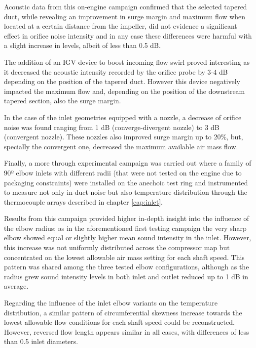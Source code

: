 Acoustic data from this on-engine campaign confirmed that the selected tapered duct, while revealing an improvement in surge margin and maximum flow when located at a certain distance from the impeller, did not evidence a significant effect in orifice noise intensity and in any case these differences were harmful with a slight increase in levels, albeit of less than 0.5 dB.

The addition of an IGV device to boost incoming flow swirl proved interesting as it decreased the acoustic intensity recorded by the orifice probe by 3-4 dB depending on the position of the tapered duct. However this device negatively impacted the maximum flow and, depending on the position of the downstream tapered section, also the surge margin. 

In the case of the inlet geometries equipped with a nozzle, a decrease of orifice noise was found ranging from 1 dB (converge-divergent nozzle) to 3 dB (convergent nozzle). These nozzles also improved surge margin up to 20\%, but, specially the convergent one, decreased the maximum available air mass flow.

Finally, a more through experimental campaign was carried out where a family of 90º elbow inlets with different radii (that were not tested on the engine due to packaging constraints) were installed on the anechoic test ring and instrumented to measure not only in-duct noise but also temperature distribution through the thermocouple arrays described in chapter \ref{cap:inlet}.

Results from this campaign provided higher in-depth insight into the influence of the elbow radius; as in the aforementioned first testing campaign the very sharp elbow showed equal or slightly higher mean sound intensity in the inlet. However, this increase was not uniformly distributed across the compressor map but concentrated on the lowest allowable air mass setting for each shaft speed. This pattern was shared among the three tested elbow configurations, although as the radius grew sound intensity levels in both inlet and outlet reduced up to 1 dB in average.

Regarding the influence of the inlet elbow variants on the temperature distribution, a similar pattern of circumferential skewness increase towards the lowest allowable flow conditions for each shaft speed could be reconstructed. However, reversed flow length appears similar in all cases, with differences of less than 0.5 inlet diameters.

